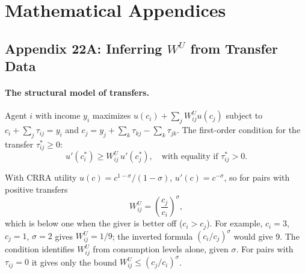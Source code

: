 \documentclass[../structural_economics_book.tex]{subfiles}
\begin{document}
\newpage
\section*{Mathematical Appendices}


\subsection*{Appendix 22A: Inferring $W^U$ from Transfer Data}
\label{ch22:app:transfer}

\paragraph{The structural model of transfers.} Agent $i$ with income $y_i$ maximizes $u(c_i) + \sum_j W^U_{ij} u(c_j)$ subject to $c_i + \sum_j \tau_{ij} = y_i$ and $c_j = y_j + \sum_k \tau_{kj} - \sum_k \tau_{jk}$. The first-order condition for the transfer $\tau_{ij}^* \ge 0$:
\begin{equation}
u'(c_i^*) \ge W^U_{ij}\, u'(c_j^*), \quad \text{with equality if } \tau_{ij}^* > 0.
\end{equation}

With CRRA utility $u(c) = c^{1-\sigma}/(1-\sigma)$, $u'(c) = c^{-\sigma}$, so for pairs with positive transfers
\[
W^U_{ij} = \left(\frac{c_j}{c_i}\right)^{\sigma},
\]
which is below one when the giver is better off ($c_i > c_j$). For example, $c_i = 3$, $c_j = 1$, $\sigma = 2$ gives $W^U_{ij} = 1/9$; the inverted formula $(c_i/c_j)^\sigma$ would give 9. The condition identifies $W^U_{ij}$ from consumption levels alone, given $\sigma$. For pairs with $\tau_{ij} = 0$ it gives only the bound $W^U_{ij} \le (c_j/c_i)^\sigma$.
\end{document}
